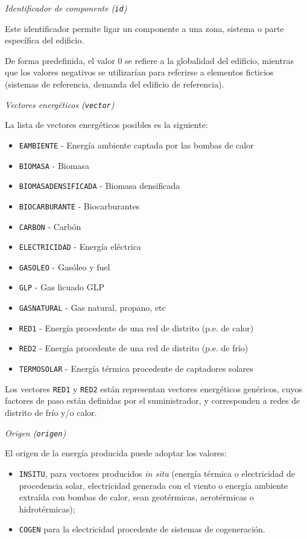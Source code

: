 \documentclass[10pt,notitlepage,oneside,a4paper]{article}
\begin{document}
\textit{Identificador de componente (\texttt{id})}

Este identificador permite ligar un componente a una zona, sistema o parte específica del edificio.

De forma predefinida, el valor 0 se refiere a la globalidad del edificio, mientras que los valores negativos se utilizarían para referirse a elementos ficticios (sistemas de referencia, demanda del edificio de referencia).

\textit{Vectores energéticos (\texttt{vector})}

La lista de vectores energéticos posibles es la siguiente:

\begin{multicols}{3}
\begin{itemize}
\item \texttt{EAMBIENTE} - Energía ambiente captada por las bombas de calor
\item \texttt{BIOMASA} - Biomasa
\item \texttt{BIOMASADENSIFICADA} - Biomasa densificada
\item \texttt{BIOCARBURANTE} - Biocarburantes
\item \texttt{CARBON} - Carbón
\item \texttt{ELECTRICIDAD} - Energía eléctrica
\item \texttt{GASOLEO} - Gasóleo y fuel
\item \texttt{GLP} - Gas licuado GLP
\item \texttt{GASNATURAL} - Gas natural, propano, etc
\item \texttt{RED1} - Energía procedente de una red de distrito (p.e. de calor)
\item \texttt{RED2} - Energía procedente de una red de distrito (p.e. de frío)
\item \texttt{TERMOSOLAR} - Energía térmica procedente de captadores solares
\end{itemize}
\end{multicols}

Los vectores \texttt{RED1} y \texttt{RED2} están representan vectores energéticos genéricos, cuyos factores de paso están definidas por el suministrador, y corresponden a redes de distrito de frío y/o calor.

\textit{Origen (\texttt{origen})}

El origen de la energía producida puede adoptar los valores:

\begin{itemize}
    \item \texttt{INSITU}, para vectores producidos \textit{in situ} (energía térmica o electricidad de procedencia solar, electricidad generada con el viento o energía ambiente extraída con bombas de calor, sean geotérmicas, aerotérmicas o hidrotérmicas);
    \item \texttt{COGEN} para la electricidad procedente de sistemas de cogeneración.
\end{itemize}
\end{document}
